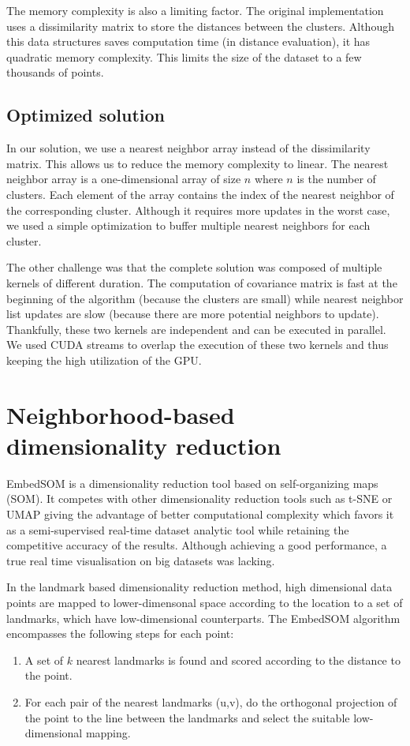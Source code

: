 The memory complexity is also a limiting factor. The original implementation uses a dissimilarity matrix to store the distances between the clusters. Although this data structures saves computation time (in distance evaluation), it has quadratic memory complexity. This limits the size of the dataset to a few thousands of points.

\subsection{Optimized solution}

In our solution, we use a nearest neighbor array instead of the dissimilarity matrix. This allows us to reduce the memory complexity to linear. The nearest neighbor array is a one-dimensional array of size $n$ where $n$ is the number of clusters. Each element of the array contains the index of the nearest neighbor of the corresponding cluster. Although it requires more updates in the worst case, we used a simple optimization to buffer multiple nearest neighbors for each cluster.

The other challenge was that the complete solution was composed of multiple kernels of different duration. The computation of covariance matrix is fast at the beginning of the algorithm (because the clusters are small) while nearest neighbor list updates are slow (because there are more potential neighbors to update). Thankfully, these two kernels are independent and can be executed in parallel. We used CUDA streams to overlap the execution of these two kernels and thus keeping the high utilization of the GPU.

\section{Neighborhood-based dimensionality reduction}

EmbedSOM is a dimensionality reduction tool based on self-organizing maps (SOM). It competes with other dimensionality reduction tools such as t-SNE or UMAP giving the advantage of better computational complexity which favors it as a semi-supervised real-time dataset analytic tool while retaining the competitive accuracy of the results.
Although achieving a good performance, a true real time visualisation on big datasets was lacking. 

In the landmark based dimensionality reduction method, high dimensional data points are mapped to lower-dimensonal space according to the location to a set of landmarks, which have low-dimensional counterparts.
The EmbedSOM algorithm encompasses the following steps for each point:
\begin{enumerate}
    \item A set of $k$ nearest landmarks is found and scored according to the distance to the point.
    \item For each pair of the nearest landmarks (u,v), do the orthogonal projection of the point to the line between the landmarks and select the suitable low-dimensional mapping.
\end{enumerate}

